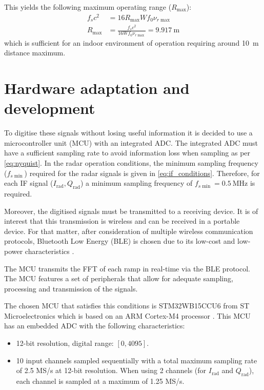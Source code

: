 This yields the following maximum operating range ($R_{\max}$):
\begin{align}
	f_s c^2 &= 16 R_{\max}W f_0 \nu_{r\max} \\
	R_{\max} &= \frac{f_s c^2}{16 W f_0 \nu_{r\max}} = \SI{9.917}{\meter}
\end{align}
which is sufficient for an indoor environment of operation requiring around \SI{10}{\meter} distance maximum.

\section{Hardware adaptation and development}
To digitise these signals without losing useful information it is decided to use a microcontroller unit (MCU) with an integrated ADC. The integrated ADC must have a sufficient sampling rate to avoid information loss when sampling as per \cref{eq:nyquist}. In the radar operation conditions, the minimum sampling frequency ($f_{s\min}$) required for the radar signals is given in \cref{eq:if_conditions}. Therefore, for each IF signal ($I_\mathrm{rad}, Q_\mathrm{rad}$) a minimum sampling frequency of $f_{s\min} = \SI{0.5}{\mega\hertz}$ is required.

Moreover, the digitised signals must be transmitted to a receiving device. It is of interest that this transmission is wireless and can be received in a portable device. For that matter, after consideration of multiple wireless communication protocols, Bluetooth Low Energy (BLE) is chosen due to its low-cost and low-power characteristics \cite{Gomez2012}.

The MCU transmits the FFT of each ramp in real-time via the BLE protocol. The MCU features a set of peripherals that allow for adequate sampling, processing and transmission of the signals.

The chosen MCU that satisfies this conditions is STM32WB15CCU6 from ST Microelectronics which is based on an ARM Cortex-M4 processor \cite{STMicroelectronics2022}. This MCU has an embedded ADC with the following characteristics:
\begin{itemize}
	\item 12-bit resolution, digital range: $[0, 4095]$.
	\item 10 input channels sampled sequentially with a total maximum sampling rate of 2.5 MS/s at 12-bit resolution. When using 2 channels (for $I_\mathrm{rad}$ and $Q_\mathrm{rad}$), each channel is sampled at a maximum of 1.25 MS/s.
\end{itemize}

